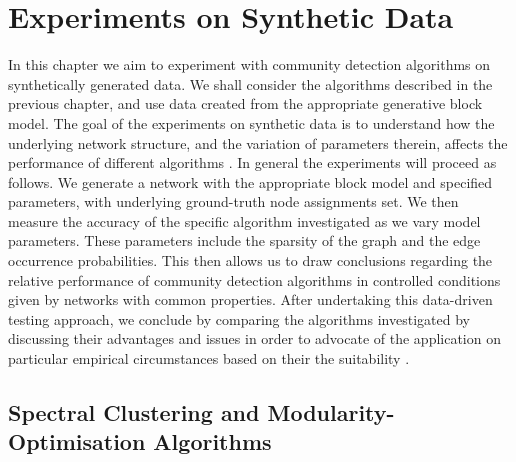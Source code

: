 
\chapter{Experiments on Synthetic Data}

\label{cha:experimentsOnSyntheticData}


In this chapter we aim to experiment with community detection algorithms on synthetically generated data.
We shall consider the algorithms described in the previous chapter, and use data created from the appropriate generative block model.
The goal of the experiments on synthetic data is to understand how the underlying
network structure, and the variation of parameters therein, affects the performance of different algorithms \cite{RLK12}.
In general the experiments will proceed as follows.
We generate a network with the appropriate block model and specified parameters, with underlying ground-truth node assignments set.
We then measure the accuracy of the specific algorithm investigated as we vary model parameters.
These parameters include the sparsity of the graph and the edge occurrence probabilities.
This then allows us to draw conclusions regarding the relative performance of community detection algorithms in controlled conditions given by networks with common properties.
After undertaking this data-driven testing approach, we conclude by comparing the algorithms investigated by discussing their advantages and issues in order to advocate of the application on particular empirical circumstances based on their the suitability .


\section{Spectral Clustering and Modularity-Optimisation Algorithms}
\label{sec:spectralClusteringModularityOptimisationAlgorithms}

